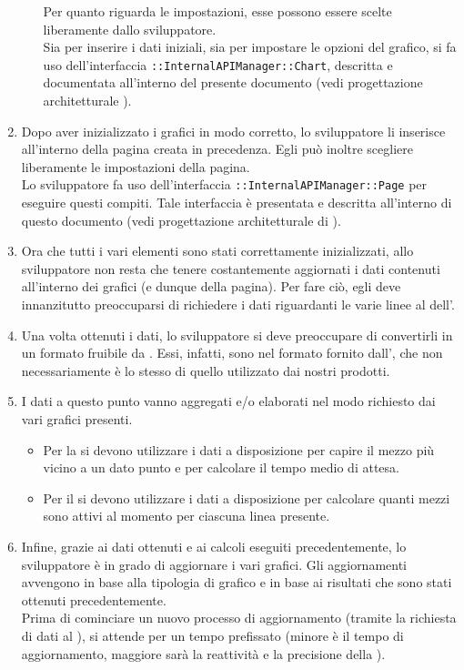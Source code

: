 \begin{enumerate}
\begin{itemize}
                Per quanto riguarda le impostazioni, esse possono essere scelte liberamente dallo sviluppatore.\\
                Sia per inserire i dati iniziali, sia per impostare le opzioni del grafico, si fa uso dell'interfaccia \texttt{::InternalAPIManager::Chart}, descritta e documentata all'interno del presente documento (vedi progettazione architetturale ).
            \end{itemize}
            \item Dopo aver inizializzato i grafici in modo corretto, lo sviluppatore li inserisce all'interno della pagina creata in precedenza. Egli può inoltre scegliere liberamente le impostazioni della pagina.\\
            Lo sviluppatore fa uso dell'interfaccia \texttt{::InternalAPIManager::Page} per eseguire questi compiti. Tale interfaccia è presentata e descritta all'interno di questo documento (vedi progettazione architetturale di ).
            \item Ora che tutti i vari elementi sono stati correttamente inizializzati, allo sviluppatore non resta che tenere costantemente aggiornati i dati contenuti all'interno dei grafici (e dunque della pagina). Per fare ciò, egli deve innanzitutto preoccuparsi di richiedere i dati riguardanti le varie linee al  dell'.
            \item Una volta ottenuti i dati, lo sviluppatore si deve preoccupare di convertirli in un formato fruibile da . Essi, infatti, sono nel formato fornito dall', che non necessariamente è lo stesso di quello utilizzato dai nostri prodotti.
            \item I dati a questo punto vanno aggregati e/o elaborati nel modo richiesto dai vari grafici presenti.
            \begin{itemize}
                \item Per la  si devono utilizzare i dati a disposizione per capire il mezzo più vicino a un dato punto e per calcolare il tempo medio di attesa.
                \item Per il  si devono utilizzare i dati a disposizione per calcolare quanti mezzi sono attivi al momento per ciascuna linea presente.
            \end{itemize}
            \item Infine, grazie ai dati ottenuti e ai calcoli eseguiti precedentemente, lo sviluppatore è in grado di aggiornare i vari grafici. Gli aggiornamenti avvengono in base alla tipologia di grafico e in base ai risultati che sono stati ottenuti precedentemente.\\
            Prima di cominciare un nuovo processo di aggiornamento (tramite la richiesta di dati al  ), si attende per un tempo prefissato (minore è il tempo di aggiornamento, maggiore sarà la reattività e la precisione della ).
        \end{enumerate}